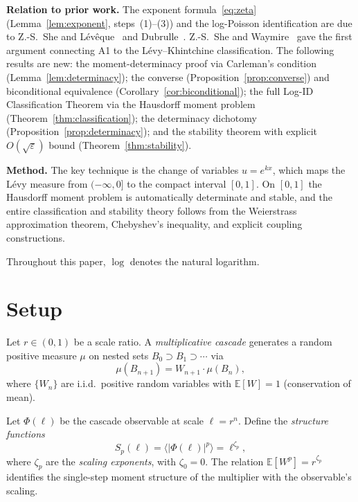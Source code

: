 \documentclass[12pt]{amsart}
\theoremstyle{definition}
\theoremstyle{remark}
\begin{document}
\smallskip
\noindent\textbf{Relation to prior work.}
The exponent formula~\eqref{eq:zeta} (Lemma~\ref{lem:exponent},
steps~(1)--(3)) and the log-Poisson identification are due to
Z.-S.~She and L\'ev\^eque~\cite{SL94} and Dubrulle~\cite{Dub94}.
Z.-S.~She and Waymire~\cite{SW95} gave the first argument connecting
A1 to the L\'evy--Khintchine classification.  The following results are new: the moment-determinacy proof via Carleman's
condition (Lemma~\ref{lem:determinacy}); the converse
(Proposition~\ref{prop:converse}) and biconditional equivalence
(Corollary~\ref{cor:biconditional}); the full Log-ID Classification
Theorem via the Hausdorff moment problem
(Theorem~\ref{thm:classification}); the determinacy dichotomy
(Proposition~\ref{prop:determinacy}); and the stability theorem with
explicit $O(\sqrt{\varepsilon})$ bound
(Theorem~\ref{thm:stability}).

\smallskip
\noindent\textbf{Method.}
The key technique is the change of variables $u = e^{kx}$, which maps
the L\'evy measure from $(-\infty,0]$ to the compact interval
$[0,1]$.  On $[0,1]$ the Hausdorff moment problem is automatically
determinate and stable, and the entire classification and stability
theory follows from the Weierstrass approximation theorem,
Chebyshev's inequality, and explicit coupling constructions.

\smallskip
Throughout this paper, $\log$ denotes the natural logarithm.


\section{Setup}
\label{sec:setup}

Let $r \in (0,1)$ be a scale ratio.  A \emph{multiplicative cascade}
generates a random positive measure $\mu$ on nested sets $B_0 \supset
B_1 \supset \cdots$ via
\[
  \mu(B_{n+1}) = W_{n+1} \cdot \mu(B_n),
\]
where $\{W_n\}$ are i.i.d.\ positive random variables with
$\mathbb{E}[W] = 1$ (conservation of mean).

Let $\Phi(\ell)$ be the cascade observable at scale $\ell = r^n$.
Define the \emph{structure functions}
\[
  S_p(\ell) = \langle |\Phi(\ell)|^p \rangle = \ell^{\zeta_p},
\]
where $\zeta_p$ are the \emph{scaling exponents}, with $\zeta_0 = 0$.
The relation $\mathbb{E}[W^p] = r^{\zeta_p}$ identifies the
single-step moment structure of the multiplier with the observable's
scaling.
\end{document}
